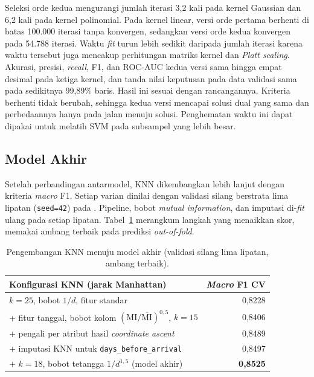 Seleksi orde kedua mengurangi jumlah iterasi 3,2 kali pada kernel Gaussian dan 6,2 kali pada kernel polinomial. Pada kernel linear, versi orde pertama berhenti di batas 100.000 iterasi tanpa konvergen, sedangkan versi orde kedua konvergen pada 54.788 iterasi. Waktu \textit{fit} turun lebih sedikit daripada jumlah iterasi karena waktu tersebut juga mencakup perhitungan matriks kernel dan \textit{Platt scaling}. Akurasi, presisi, \textit{recall}, F1, dan ROC-AUC kedua versi sama hingga empat desimal pada ketiga kernel, dan tanda nilai keputusan pada data validasi sama pada sedikitnya 99,89\% baris. Hasil ini sesuai dengan rancangannya. Kriteria berhenti tidak berubah, sehingga kedua versi mencapai solusi dual yang sama dan perbedaannya hanya pada jalan menuju solusi. Penghematan waktu ini dapat dipakai untuk melatih SVM pada subsampel yang lebih besar.

\subsection{Model Akhir}\label{sec:model-akhir}
Setelah perbandingan antarmodel, KNN dikembangkan lebih lanjut dengan kriteria \textit{macro} F1. Setiap varian dinilai dengan validasi silang berstrata lima lipatan (\texttt{seed=42}) pada . Pipeline, bobot \textit{mutual information}, dan imputasi di-\textit{fit} ulang pada setiap lipatan. Tabel~\ref{tab:model-akhir} merangkum langkah yang menaikkan skor, memakai ambang terbaik pada prediksi \textit{out-of-fold}.

\begin{table}[htbp]
    \centering
    \small
    \begin{tabular}{@{}l r@{}}
        \toprule
        Konfigurasi KNN (jarak Manhattan) & \textit{Macro} F1 CV \\
        \midrule
        $k=25$, bobot $1/d$, fitur standar & 0,8228 \\
        + fitur tanggal, bobot kolom $(\mathrm{MI}/\overline{\mathrm{MI}})^{0{,}5}$, $k=15$ & 0,8406 \\
        + pengali per atribut hasil \textit{coordinate ascent} & 0,8489 \\
        + imputasi KNN untuk \texttt{days\_before\_arrival} & 0,8497 \\
        + $k=18$, bobot tetangga $1/d^{1{,}5}$ (model akhir) & \textbf{0,8525} \\
        \bottomrule
    \end{tabular}
    \caption{Pengembangan KNN menuju model akhir (validasi silang lima lipatan, ambang terbaik).}
    \label{tab:model-akhir}
\end{table}

